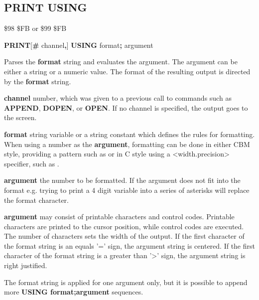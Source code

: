 \subsection{PRINT USING}
\begin{description}[leftmargin=2cm,style=nextline]
\item [Token:] \$98 \$FB or \$99 \$FB
\item [Format:] {\bf PRINT}[{\bf\#} channel{\bf,}] {\bf USING} format{\bf;} argument
\item [Usage:]  Parses the {\bf format} string and evaluates the argument.
                The argument can be either a string or a numeric value.
                The format of the resulting output is directed
                by the {\bf format} string.

                {\bf channel} number, which was given to a previous
                call to commands such as {\bf APPEND}, {\bf DOPEN}, or {\bf OPEN}.
                If no channel is specified, the output goes to the screen.

                {\bf format} string variable or a string constant
                which defines the rules for formatting.
                When using a number as the {\bf argument}, formatting can be done in either
                CBM style, providing a pattern such as 
                or in C style using a <width.precision> specifier, such as .

                {\bf argument} the number to be formatted. If the argument does not fit into the format
                e.g. trying to print a 4 digit variable into \screentext{\#\#\#}
                a series of asterisks will replace the format character.

                {\bf argument} may consist of printable
                characters and control codes. Printable characters
                are printed to the cursor position, while control
                codes are executed.
                The number of \screentext{\#} characters sets the width of the output.
                If the first character of the format string
                is an equals '=' sign, the argument string is centered.
                If the first character of the format string
                is a greater than '>' sign, the argument string is right justified.

\item [Remarks:] The format string is applied for one argument only,
                 but it is possible to append more
                 {\bf USING format;argument} sequences.



\end{description}
